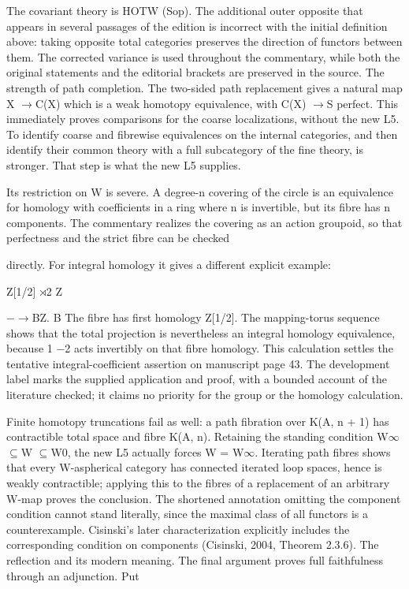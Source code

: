 The covariant theory is HOTW (Sop). The additional outer opposite that appears in several passages of the edition is incorrect with the initial definition above: taking opposite total categories preserves the direction of functors between them. The corrected variance is used throughout the commentary, while both the original statements and the editorial brackets are preserved in the source. The strength of path completion. The two-sided path replacement gives a natural map X \ensuremath{\to}C(X) which is a weak homotopy equivalence, with C(X) \ensuremath{\to}S perfect. This immediately proves comparisons for the coarse localizations, without the new L5. To identify coarse and fibrewise equivalences on the internal categories, and then identify their common theory with a full subcategory of the fine theory, is stronger. That step is what the new L5 supplies.


Its restriction on W is severe. A degree-n covering of the circle is an equivalence for homology with coefficients in a ring where n is invertible, but its fibre has n components. The commentary realizes the covering as an action groupoid, so that perfectness and the strict fibre can be checked


directly. For integral homology it gives a different explicit example:


Z[1/2] \ensuremath{\rtimes}2 Z


  \ensuremath{-}\ensuremath{\to}BZ. B The fibre has first homology Z[1/2]. The mapping-torus sequence shows that the total projection is nevertheless an integral homology equivalence, because 1 \ensuremath{-}2 acts invertibly on that fibre homology. This calculation settles the tentative integral-coefficient assertion on manuscript page 43. The development label marks the supplied application and proof, with a bounded account of the literature checked; it claims no priority for the group or the homology calculation.


Finite homotopy truncations fail as well: a path fibration over K(A, n + 1) has contractible total space and fibre K(A, n). Retaining the standing condition W\ensuremath{\infty}\ensuremath{\subseteq}W \ensuremath{\subseteq}W0, the new L5 actually forces W = W\ensuremath{\infty}. Iterating path fibres shows that every W-aspherical category has connected iterated loop spaces, hence is weakly contractible; applying this to the fibres of a replacement of an arbitrary W-map proves the conclusion. The shortened annotation omitting the component condition cannot stand literally, since the maximal class of all functors is a counterexample. Cisinski’s later characterization explicitly includes the corresponding condition on components (Cisinski, 2004, Theorem 2.3.6). The reflection and its modern meaning. The final argument proves full faithfulness through an adjunction. Put


